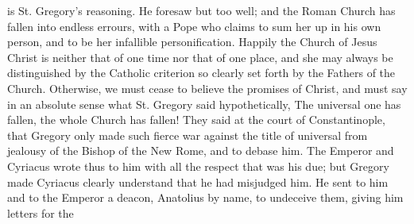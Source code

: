 is St. Gregory's reasoning. He foresaw but too well; and the Roman Church has fallen into endless errours, with a Pope who claims to sum her up in his own person, and to be her infallible personification. Happily the Church of Jesus Christ is neither that of one time nor that of one place, and she may always be distinguished by the Catholic criterion so clearly set forth by the Fathers of the Church. Otherwise, we must cease to believe the promises of Christ, and must say in an absolute sense what St. Gregory said hypothetically, The universal one has fallen, the whole Church has fallen! They said at the court of Constantinople, that Gregory only made such fierce war against the title of universal from jealousy of the Bishop of the New Rome, and to debase him. The Emperor and Cyriacus wrote thus to him with all the respect that was his due; but Gregory made Cyriacus clearly understand that he had misjudged him. He sent to him and to the Emperor a deacon, Anatolius by name, to undeceive them, giving him letters for the

